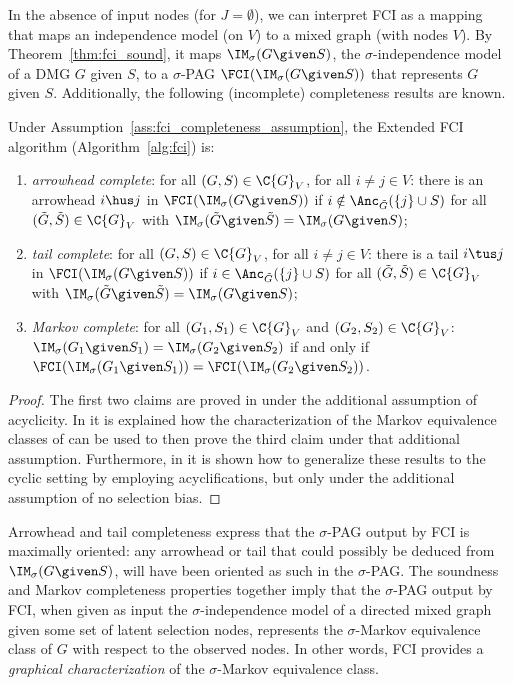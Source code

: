 In the absence of input nodes (for $J = \emptyset$), we can interpret FCI as a mapping that maps an independence model (on $V$) to a mixed graph (with nodes $V$).
By Theorem~\ref{thm:fci_sound}, it maps $\IM_\sigma(G\given S)$, the $\sigma$-independence model of a DMG $G$ given $S$, to a $\sigma$-PAG $\FCI(\IM_\sigma(G \given S))$ that represents $G$ given $S$.
Additionally, the following (incomplete) completeness results are known.
\begin{Thm}\label{thm:fci_complete}
Under Assumption~\ref{ass:fci_completeness_assumption}, the Extended FCI algorithm (Algorithm~\ref{alg:fci}) is:
  \begin{enumerate}[label=(\roman*)]
    \item \emph{arrowhead complete}: for all $(G,S) \in \C{G}_V$, for all $i \ne j \in V$: there is an arrowhead $i \hus j$ in $\FCI(\IM_\sigma(G \given S))$ if $i \notin \Anc_{\tilde{G}}(\{j\} \cup S)$ for all $(\tilde{G},\tilde{S}) \in \C{G}_V$ with $\IM_\sigma(\tilde{G} \given \tilde{S}) = \IM_\sigma(G \given S)$;
    \item \emph{tail complete}: for all $(G,S) \in \C{G}_V$, for all $i \ne j \in V$: there is a tail $i \tus j$ in $\FCI(\IM_\sigma(G \given S))$ if $i \in \Anc_{\tilde{G}}(\{j\} \cup S)$ for all $(\tilde{G},\tilde{S}) \in \C{G}_V$ with $\IM_\sigma(\tilde{G} \given \tilde{S}) = \IM_\sigma(G \given S)$;
    \item \emph{Markov complete}: for all $(G_1,S_1) \in \C{G}_V$ and $(G_2,S_2) \in \C{G}_V$: $\IM_\sigma(G_1 \given S_1) = \IM_\sigma(G_2 \given S_2)$ if and only if $\FCI(\IM_\sigma(G_1 \given S_1)) = \FCI(\IM_\sigma(G_2 \given S_2))$.
  \end{enumerate}
\end{Thm}
\begin{proof}
  The first two claims are proved in \cite{Zhang2008_AI} under the additional assumption of acyclicity.
  In \cite{MooijClaassen_UAI_20} it is explained how the characterization of the Markov equivalence classes of \cite{Ali++2005} can be used to then prove the third claim under that additional assumption.
  Furthermore, in \cite{MooijClaassen_UAI_20} it is shown how to generalize these results to the cyclic setting by employing acyclifications, but only under the additional assumption of no selection bias.
\end{proof}

Arrowhead and tail completeness express that the $\sigma$-PAG output by FCI is maximally oriented: any arrowhead or tail that could possibly be deduced from $\IM_\sigma(G \given S)$, will have been oriented as such in the $\sigma$-PAG.
The soundness and Markov completeness properties together imply that the $\sigma$-PAG output by FCI, when given as input the $\sigma$-independence model of a directed mixed graph given some set of latent selection nodes, represents the $\sigma$-Markov equivalence class of $G$ with respect to the observed nodes.
In other words, FCI provides a \emph{graphical characterization} of the $\sigma$-Markov equivalence class.
